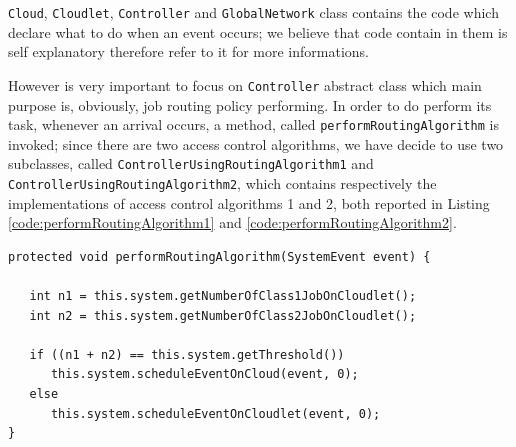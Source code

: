 \documentclass[10pt,a4paper]{article}
\begin{document}
\texttt{Cloud}, \texttt{Cloudlet}, \texttt{Controller} and \texttt{GlobalNetwork} class contains the code which declare   what to do when an event occurs; we believe that code contain in them is self explanatory therefore refer to it for more informations.

However is very important to focus on \texttt{Controller} abstract class which main purpose is, obviously, job routing policy performing.
In order to do perform its task, whenever an arrival occurs, a method, called \texttt{performRoutingAlgorithm}
is invoked; since there are two access control algorithms, we have decide to use two subclasses, called \texttt{Controller\-Using\-Routing\-Algorithm1} and \texttt{Controller\-Using\-Routing\-Algorithm2}, which contains respectively the implementations of access control algorithms 1 and 2, both reported in Listing \ref{code:performRoutingAlgorithm1} and \ref{code:performRoutingAlgorithm2}.

\begin{lstlisting}[frame=lines, caption={\texttt{performRoutingAlgorithm} method implementation concerning access control algorithm 1.},label={code:performRoutingAlgorithm1}]
protected void performRoutingAlgorithm(SystemEvent event) {

   int n1 = this.system.getNumberOfClass1JobOnCloudlet();
   int n2 = this.system.getNumberOfClass2JobOnCloudlet();

   if ((n1 + n2) == this.system.getThreshold())
      this.system.scheduleEventOnCloud(event, 0);
   else
      this.system.scheduleEventOnCloudlet(event, 0);
}
\end{lstlisting}
\end{document}

